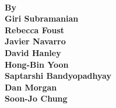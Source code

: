 \vspace*{4cm}
\begin{center}
{\bf 
{\fontsize{50cm}{25pt}} \\
\vspace{0.5cm}
{\large By}\\
\vspace{0.5cm}
{\Large Giri Subramanian \\
Rebecca Foust \\
Javier Navarro \\
David Hanley \\
Hong-Bin Yoon \\
Saptarshi Bandyopadhyay \\
Dan Morgan \\
Soon-Jo Chung \\
}
}
\end{center}

